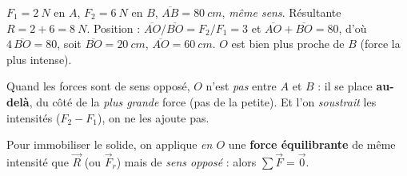 \documentclass[11pt,a4paper]{article}
\newcommand{\vv}[1]{\vec{#1}}\newcommand{\ds}{\displaystyle}
\begin{document}
\begin{exemplebox}
$F_1=\qty{2}{N}$ en $A$, $F_2=\qty{6}{N}$ en $B$, $\overline{AB}=\qty{80}{cm}$, \emph{même sens}.
Résultante $R = 2+6 = \qty{8}{N}$. Position : $\overline{AO}/\overline{BO}=F_2/F_1=3$ et
$\overline{AO}+\overline{BO}=80$, d'où $4\,\overline{BO}=80$, soit $\overline{BO}=\qty{20}{cm}$,
$\overline{AO}=\qty{60}{cm}$. $O$ est bien plus proche de $B$ (force la plus intense).
\end{exemplebox}

\begin{piege}
Quand les forces sont de sens opposé, $O$ n'est \emph{pas} entre $A$ et $B$ : il se place
\textbf{au-delà}, du côté de la \emph{plus grande} force (pas de la petite). Et l'on \emph{soustrait}
les intensités ($F_2-F_1$), on ne les ajoute pas.
\end{piege}

\begin{remarque}
Pour immobiliser le solide, on applique \emph{en $O$} une \textbf{force équilibrante} de même
intensité que $\vv R$ (ou $\vv F_r$) mais de \emph{sens opposé} : alors $\sum\vv F=\vv 0$.
\end{remarque}
\end{document}
